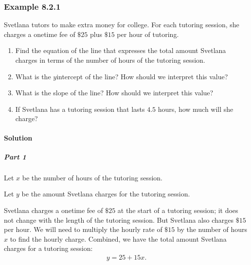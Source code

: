 \documentclass[letterpaper,10pt,english]{jupyterBook}
\begin{document}
\subsubsection{Example 8.2.1}
\label{\detokenize{Ch8 Correlation and Linear Regression/8.2 Linear Equations:example-8-2-1}}
\sphinxAtStartPar
Svetlana tutors to make extra money for college. For each tutoring session, she charges a one\sphinxhyphen{}time fee of \(\$25\) plus \(\$15\) per hour of tutoring.
\begin{enumerate}
%
\item {} 
\sphinxAtStartPar
Find the equation of the line that expresses the total amount Svetlana charges in terms of the number of hours of the tutoring session.

\item {} 
\sphinxAtStartPar
What is the \(y\)\sphinxhyphen{}intercept of the line? How should we interpret this value?

\item {} 
\sphinxAtStartPar
What is the slope of the line? How should we interpret this value?

\item {} 
\sphinxAtStartPar
If Svetlana has a tutoring session that lasts \(4.5\) hours, how much will she charge?

\end{enumerate}


\paragraph{Solution}
\label{\detokenize{Ch8 Correlation and Linear Regression/8.2 Linear Equations:solution}}

\subparagraph{Part 1}
\label{\detokenize{Ch8 Correlation and Linear Regression/8.2 Linear Equations:part-1}}
\sphinxAtStartPar
Let \(x\) be the number of hours of the tutoring session.

\sphinxAtStartPar
Let \(y\) be the amount Svetlana charges for the tutoring session.

\sphinxAtStartPar
Svetlana charges a one\sphinxhyphen{}time fee of \(\$25\) at the start of a tutoring session; it does not change with the length of the tutoring session. But Svetlana also charges \(\$15\) per hour. We will need to multiply the hourly rate of \(\$15\) by the number of hours \(x\) to find the hourly charge. Combined, we have the total amount Svetlana charges for a tutoring session:
\begin{equation*}
\begin{split} y = 25 + 15x. \end{split}
\end{equation*}
\end{document}

